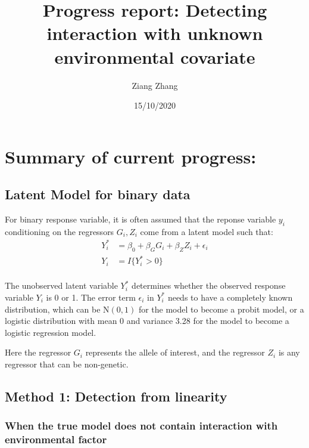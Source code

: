 \documentclass[
]{article}
\title{Progress report: Detecting interaction with unknown environmental
covariate}
\author{Ziang Zhang}
\date{15/10/2020}
\begin{document}
\maketitle

\hypertarget{summary-of-current-progress}{%
\section{Summary of current
progress:}\label{summary-of-current-progress}}

\hypertarget{latent-model-for-binary-data}{%
\subsection{Latent Model for binary
data}\label{latent-model-for-binary-data}}

For binary response variable, it is often assumed that the reponse
variable \(y_i\) conditioning on the regressors \(G_i,Z_i\) come from a
latent model such that: \begin{equation}\label{eqn:latentformulation}
\begin{aligned}
Y_i^* &= \beta_0 + \beta_G G_i + \beta_Z Z_i + \epsilon_i \\
Y_i &= I\{Y_i^*>0\} \\
\end{aligned}
\end{equation}

The unobserved latent variable \(Y_i^*\) determines whether the observed
response variable \(Y_i\) is 0 or 1. The error term \(\epsilon_i\) in
\(Y_i^*\) needs to have a completely known distribution, which can be
\(\text{N}(0,1)\) for the model to become a probit model, or a logistic
distribution with mean 0 and variance 3.28 for the model to become a
logistic regression model.

Here the regressor \(G_i\) represents the allele of interest, and the
regressor \(Z_i\) is any regressor that can be non-genetic.

\hypertarget{method-1-detection-from-linearity}{%
\subsection{Method 1: Detection from
linearity}\label{method-1-detection-from-linearity}}

\hypertarget{when-the-true-model-does-not-contain-interaction-with-environmental-factor}{%
\subsubsection{When the true model does not contain interaction with
environmental
factor}\label{when-the-true-model-does-not-contain-interaction-with-environmental-factor}}
\end{document}
